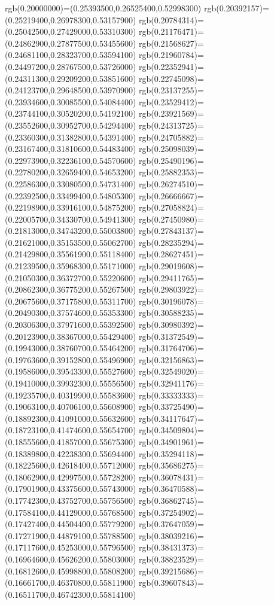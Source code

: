 {{rgb(0.20000000)=(0.25393500,0.26525400,0.52998300)
rgb(0.20392157)=(0.25219400,0.26978300,0.53157900)
rgb(0.20784314)=(0.25042500,0.27429000,0.53310300)
rgb(0.21176471)=(0.24862900,0.27877500,0.53455600)
rgb(0.21568627)=(0.24681100,0.28323700,0.53594100)
rgb(0.21960784)=(0.24497200,0.28767500,0.53726000)
rgb(0.22352941)=(0.24311300,0.29209200,0.53851600)
rgb(0.22745098)=(0.24123700,0.29648500,0.53970900)
rgb(0.23137255)=(0.23934600,0.30085500,0.54084400)
rgb(0.23529412)=(0.23744100,0.30520200,0.54192100)
rgb(0.23921569)=(0.23552600,0.30952700,0.54294400)
rgb(0.24313725)=(0.23360300,0.31382800,0.54391400)
rgb(0.24705882)=(0.23167400,0.31810600,0.54483400)
rgb(0.25098039)=(0.22973900,0.32236100,0.54570600)
rgb(0.25490196)=(0.22780200,0.32659400,0.54653200)
rgb(0.25882353)=(0.22586300,0.33080500,0.54731400)
rgb(0.26274510)=(0.22392500,0.33499400,0.54805300)
rgb(0.26666667)=(0.22198900,0.33916100,0.54875200)
rgb(0.27058824)=(0.22005700,0.34330700,0.54941300)
rgb(0.27450980)=(0.21813000,0.34743200,0.55003800)
rgb(0.27843137)=(0.21621000,0.35153500,0.55062700)
rgb(0.28235294)=(0.21429800,0.35561900,0.55118400)
rgb(0.28627451)=(0.21239500,0.35968300,0.55171000)
rgb(0.29019608)=(0.21050300,0.36372700,0.55220600)
rgb(0.29411765)=(0.20862300,0.36775200,0.55267500)
rgb(0.29803922)=(0.20675600,0.37175800,0.55311700)
rgb(0.30196078)=(0.20490300,0.37574600,0.55353300)
rgb(0.30588235)=(0.20306300,0.37971600,0.55392500)
rgb(0.30980392)=(0.20123900,0.38367000,0.55429400)
rgb(0.31372549)=(0.19943000,0.38760700,0.55464200)
rgb(0.31764706)=(0.19763600,0.39152800,0.55496900)
rgb(0.32156863)=(0.19586000,0.39543300,0.55527600)
rgb(0.32549020)=(0.19410000,0.39932300,0.55556500)
rgb(0.32941176)=(0.19235700,0.40319900,0.55583600)
rgb(0.33333333)=(0.19063100,0.40706100,0.55608900)
rgb(0.33725490)=(0.18892300,0.41091000,0.55632600)
rgb(0.34117647)=(0.18723100,0.41474600,0.55654700)
rgb(0.34509804)=(0.18555600,0.41857000,0.55675300)
rgb(0.34901961)=(0.18389800,0.42238300,0.55694400)
rgb(0.35294118)=(0.18225600,0.42618400,0.55712000)
rgb(0.35686275)=(0.18062900,0.42997500,0.55728200)
rgb(0.36078431)=(0.17901900,0.43375600,0.55743000)
rgb(0.36470588)=(0.17742300,0.43752700,0.55756500)
rgb(0.36862745)=(0.17584100,0.44129000,0.55768500)
rgb(0.37254902)=(0.17427400,0.44504400,0.55779200)
rgb(0.37647059)=(0.17271900,0.44879100,0.55788500)
rgb(0.38039216)=(0.17117600,0.45253000,0.55796500)
rgb(0.38431373)=(0.16964600,0.45626200,0.55803000)
rgb(0.38823529)=(0.16812600,0.45998800,0.55808200)
rgb(0.39215686)=(0.16661700,0.46370800,0.55811900)
rgb(0.39607843)=(0.16511700,0.46742300,0.55814100)
}}
